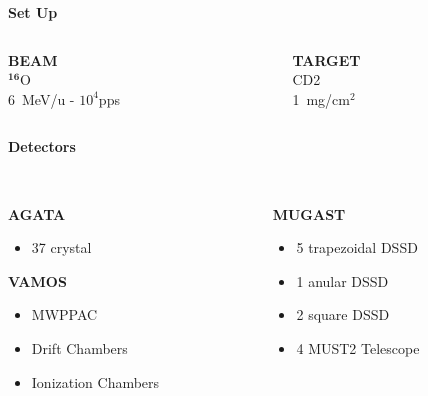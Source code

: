 \documentclass[10pt]{beamer}
\begin{document}
\begin{frame}
\centering
\vspace{0.05\textheight}
\textbf{\LARGE Set Up}
\vspace{0.05\textheight}
\begin{columns}
	\begin{column}{0.6\textwidth}
			\centering
			\vspace{-0.1\textheight}
			\begin{columns}
				\begin{column}{0.5\textwidth}
					\center
					\textbf{BEAM}\\
					\vspace{0.03\textheight}
					$\mathbf{^{16}}$O \\
					6~MeV/u - $10^{4}$pps
				\end{column}
	
				\begin{column}{0.5\textwidth}
					\center
					\textbf{TARGET}\\
					\vspace{0.03\textheight}
					CD2\\
					1~mg/cm$^2$	
				\end{column}
			\end{columns}
			\vspace{0.05\textheight}
			\textbf{\Large Detectors}
			\vspace{0.03\textheight}
			\begin{columns}
				\begin{column}{0.5\textwidth}
					\centering\\
					\textbf{AGATA}\\
					\begin{itemize}
						\item 37 crystal
					\end{itemize}
					\vspace{0.03\textheight}
					\textbf{VAMOS}\\  
					\begin{itemize}
						\item MWPPAC
						\item Drift Chambers
						\item Ionization Chambers
					\end{itemize}
				\end{column}
	
				\begin{column}{0.5\textwidth}
					\centering\\
					\vspace{-0.04\textheight}
					\textbf{MUGAST}\\
					\begin{itemize}
						\item 5 trapezoidal DSSD
	 					\item 1 anular DSSD
	 					\item 2 square DSSD 
	 					\item 4 MUST2 Telescope
					\end{itemize}
				\end{column}
			\end{columns}


\end{column}
\end{columns}
\end{frame}
\end{document}
